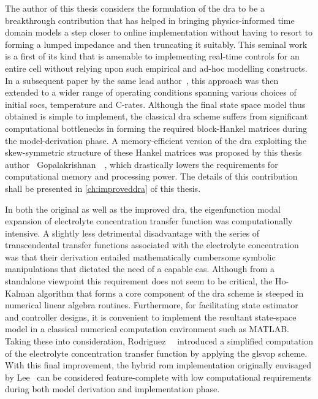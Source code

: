 The author  of this thesis  considers the formulation of  the \gls{dra} to  be a
breakthrough  contribution that  has  helped in  bringing physics-informed  time
domain models a step closer to online implementation without having to resort to
forming a lumped impedance and then truncating it suitably. This seminal work is
a first  of its  kind that  is amenable to  implementing real-time  controls for
an  entire  cell  without  relying  upon such  empirical  and  ad-hoc  modelling
constructs. In a  subsequent paper by the same  lead author~\cite{Lee2014}, this
approach was  then extended to  a wider  range of operating  conditions spanning
various  choices  of  initial  \glspl{soc}, temperature  and  C-rates.  Although
the  final  state  space  model  thus  obtained  is  simple  to  implement,  the
classical \gls{dra} scheme suffers from significant computational bottlenecks in
forming the  required block-Hankel  matrices during the  model-derivation phase.
A  memory-efficient  version  of  the \gls{dra}  exploiting  the  skew-symmetric
structure  of  these  Hankel  matrices   was  proposed  by  this  thesis  author
\ie~Gopalakrishnan~\etal{}~\cite{Gopalakrishnan2017},  which drastically  lowers
the requirements for  computational memory and processing power.  The details of
this contribution shall be presented in \cref{ch:improveddra} of this thesis.


In both the original as well  as the improved \gls{dra}, the eigenfunction modal
expansion  of electrolyte  concentration transfer  function was  computationally
intensive.  A  slightly  less  detrimental   disadvantage  with  the  series  of
transcendental transfer functions associated  with the electrolyte concentration
was   that  their   derivation  entailed   mathematically  cumbersome   symbolic
manipulations that  dictated the need  of a  capable \gls{cas}. Although  from a
standalone  viewpoint  this  requirement  does  not seem  to  be  critical,  the
\mbox{Ho-Kalman}  algorithm  that  forms  a  core  component  of  the  \gls{dra}
scheme  is  steeped  in  numerical linear  algebra  routines.  Furthermore,  for
facilitating  state  estimator  and  controller designs,  it  is  convenient  to
implement the resultant  state-space model in a  classical numerical computation
environment   such  as   \textsc{MATLAB}.  Taking   these  into   consideration,
Rodriguez~\etal{}~\cite{Rodriguez2017}  introduced a  simplified computation  of
the  electrolyte  concentration  transfer  function  by  applying  the  gls{vop}
scheme.  With  this  final  improvement,  the  hybrid  \gls{rom}  implementation
originally envisaged by Lee~\etal{} can  be considered feature-complete with low
computational  requirements  during  both model  derivation  and  implementation
phase.


